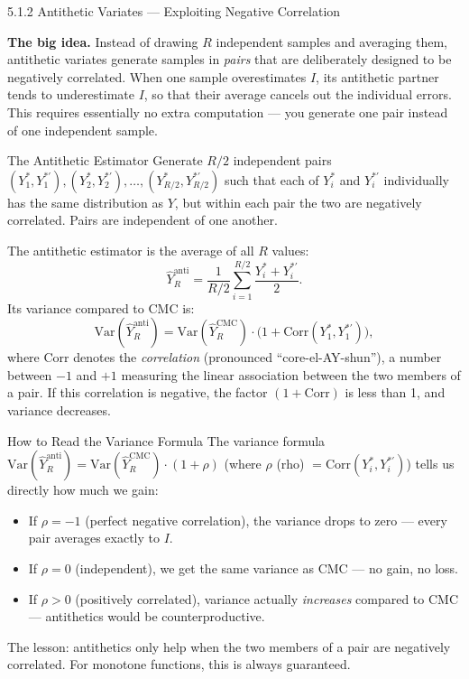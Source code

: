 \documentclass[aspectratio=169,10pt]{beamer}
\begin{document}
\begin{frame}[allowframebreaks]{5.1.2 Antithetic Variates --- Exploiting Negative Correlation}

\textbf{The big idea.}
Instead of drawing $R$ independent samples and averaging them, antithetic
variates generate samples in \emph{pairs} that are deliberately designed to be
negatively correlated.  When one sample overestimates $I$, its antithetic
partner tends to underestimate $I$, so that their average cancels out the
individual errors.  This requires essentially no extra computation --- you
generate one pair instead of one independent sample.

\begin{block}{The Antithetic Estimator}
  Generate $R/2$ independent pairs
  $(Y_1^*, Y_1^{*\prime}), (Y_2^*, Y_2^{*\prime}), \ldots, (Y_{R/2}^*, Y_{R/2}^{*\prime})$
  such that each of $Y_i^*$ and $Y_i^{*\prime}$ individually has the same
  distribution as $Y$, but within each pair the two are negatively correlated.
  Pairs are independent of one another.

  The antithetic estimator is the average of all $R$ values:
  \[
    \hat{Y}_R^{\mathrm{anti}} = \frac{1}{R/2}\sum_{i=1}^{R/2}
    \frac{Y_i^* + Y_i^{*\prime}}{2}.
  \]
  Its variance compared to CMC is:
  \[
    \mathrm{Var}(\hat{Y}_R^{\mathrm{anti}})
    = \mathrm{Var}(\hat{Y}_R^{\mathrm{CMC}}) \cdot
      \bigl(1 + \mathrm{Corr}(Y_1^*, Y_1^{*\prime})\bigr),
  \]
  where $\mathrm{Corr}$ denotes the \emph{correlation} (pronounced ``core-el-AY-shun''),
  a number between $-1$ and $+1$ measuring the linear association between
  the two members of a pair.  If this correlation is negative, the factor
  $(1 + \mathrm{Corr})$ is less than 1, and variance decreases.
\end{block}

\framebreak

\begin{alertblock}{How to Read the Variance Formula}
  The variance formula $\mathrm{Var}(\hat{Y}_R^{\mathrm{anti}}) = \mathrm{Var}(\hat{Y}_R^{\mathrm{CMC}}) \cdot (1 + \rho)$
  (where $\rho$ (rho) $= \mathrm{Corr}(Y_i^*, Y_i^{*\prime})$) tells us directly
  how much we gain:
  \begin{itemize}
    \item If $\rho = -1$ (perfect negative correlation), the variance drops to zero ---
          every pair averages exactly to $I$.
    \item If $\rho = 0$ (independent), we get the same variance as CMC ---
          no gain, no loss.
    \item If $\rho > 0$ (positively correlated), variance actually \emph{increases}
          compared to CMC --- antithetics would be counterproductive.
  \end{itemize}
  The lesson: antithetics only help when the two members of a pair are
  negatively correlated.  For monotone functions, this is always guaranteed.
\end{alertblock}


\end{frame}
\end{document}
